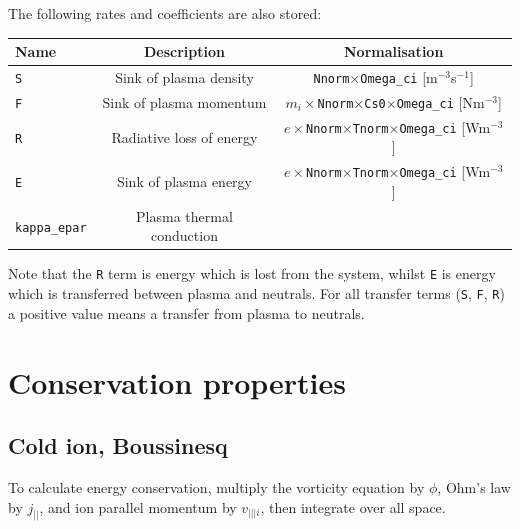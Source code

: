 \documentclass[12pt,a4paper]{article}
\begin{document}
\noindent The following rates and coefficients are also stored:
\begin{center}
\begin{tabular}{l c c}
  Name & Description & Normalisation \\
  \hline
  \texttt{S} & Sink of plasma density & \texttt{Nnorm}$\times$\texttt{Omega\_ci} [m$^{-3}$s$^{-1}$] \\
  \texttt{F} & Sink of plasma momentum & $m_i\times$\texttt{Nnorm}$\times$\texttt{Cs0}$\times$\texttt{Omega\_ci} [Nm$^{-3}$] \\
  \texttt{R} & Radiative loss of energy & $e\times$\texttt{Nnorm}$\times$\texttt{Tnorm}$\times$\texttt{Omega\_ci} [Wm$^{-3}$] \\
  \texttt{E} & Sink of plasma energy & $e\times$\texttt{Nnorm}$\times$\texttt{Tnorm}$\times$\texttt{Omega\_ci} [Wm$^{-3}$] \\
  \texttt{kappa\_epar} & Plasma thermal conduction & \\ 
  \hline
\end{tabular}
\end{center}
Note that the \texttt{R} term is energy which is lost from the system, whilst \texttt{E} is energy which is
transferred between plasma and neutrals. For all transfer terms (\texttt{S}, \texttt{F}, \texttt{R}) a positive value means
a transfer from plasma to neutrals.


\section{Conservation properties}
\label{sec:conservation}

\subsection{Cold ion, Boussinesq}

To calculate energy conservation, multiply the vorticity equation by $\phi$, Ohm's law by $j_{||}$, and ion parallel momentum by $v_{|||i}$, then integrate over all space.
\end{document}
